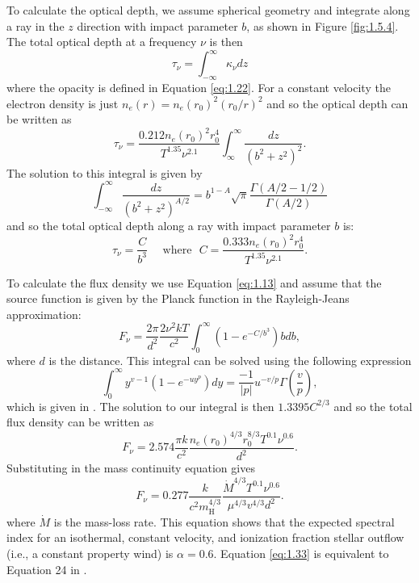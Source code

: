 To calculate the optical depth, we assume spherical geometry and integrate along a ray in the $z$ direction with impact parameter $b$, as shown in Figure \ref{fig:1.5.4}. The total optical depth at a frequency $\nu$ is then
\begin{equation}
\tau _{\nu} = \int ^{\infty} _{-\infty} \kappa _{\nu} dz
\end{equation}
where the opacity is defined in Equation \ref{eq:1.22}. For a constant velocity the electron density is just $n_{e}(r)=n_{e}(r_{0})^2(r_{0}/r)^2$ and so the optical depth can be written as
\begin{equation}
\tau _{\nu} = \frac{0.212n_{e}(r_{0})^2r_{0}^4}{T^{1.35}\nu ^{2.1}}\int ^{\infty} _{\infty}\frac{dz}{(b^2 + z^2)^2}.
\end{equation}
The solution to this integral is given by \citep{gradshteyn_1994}
\begin{equation}
\int ^{\infty} _{-\infty} \frac{dz}{(b^2 + z^2)^{A/2}}=b^{1-A}\sqrt{\pi}\frac{\Gamma (A/2 -1/2)}{\Gamma (A/2)}
\end{equation}
and so the total optical depth along a ray with impact parameter $b$ is:
\begin{equation}
\tau _{\nu} = \frac{C}{b^3}\ \ \ \ \ \ \mathrm{where}\ \ \ C=\frac{0.333n_{e}(r_{0})^2r_{0}^4}{T^{1.35}\nu ^{2.1}}.
\end{equation}

To calculate the flux density we use Equation \ref{eq:1.13} and assume that the source function is given by the Planck function in the Rayleigh-Jeans approximation:
\begin{equation}
F_{\nu} = \frac{2\pi}{d^2}\frac{2\nu ^2 kT}{c^2} \int ^{\infty} _{0}(1-e^{-C/b^3})bdb,
\end{equation}
where $d$ is the distance. This integral can be solved using the following expression
\begin{equation}
\int ^{\infty} _{0}y^{v-1}(1-e^{-uy^p})dy=\frac{-1}{|p|}u^{-v/p}\Gamma \left(\frac{v}{p} \right),
\end{equation}
which is given in \cite{gradshteyn_1994}. The solution to our integral is then $1.3395C^{2/3}$ and so the total flux density can be written as 
\begin{equation}\label{eq:1.32}
F_{\nu} = 2.574\frac{\pi k}{c^2}\dfrac{n_e(r_0)^{4/3}r_0^{8/3}T^{0.1}\nu ^{0.6}}{d^2}.
\end{equation}
Substituting in the mass continuity equation gives
\begin{equation}\label{eq:1.33}
F_{\nu} = 0.277\frac{k}{c^2 m_{\mathrm{H}}^{4/3}}\dfrac{\dot{M}^{4/3}T^{0.1}\nu ^{0.6}}{\mu ^{4/3}v^{4/3}d^2}.
\end{equation}
where $\dot{M}$ is the mass-loss rate. This equation shows that the expected spectral index for an isothermal, constant velocity, and ionization fraction stellar outflow (i.e., a constant property wind) is $\alpha =0.6$. Equation \ref{eq:1.33} is equivalent to Equation 24 in \cite{panagia_1975}.

